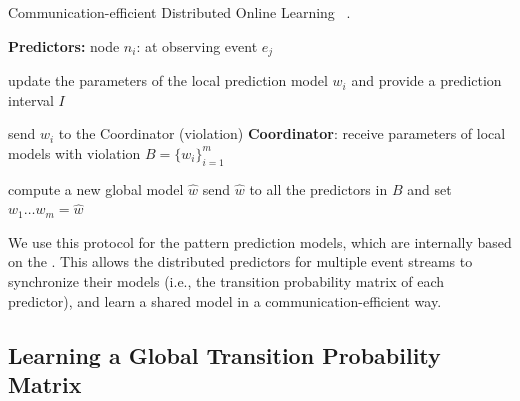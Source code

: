 \begin{algorithm}[h]
	\caption{Communication-efficient Distributed Online Learning~\cite{kamp2014communication} .} 
	\begin{algorithmic}[1] 
		
		\Statex \Indm  \textbf{Predictors:}
		\Statex \Indp node $n_i$: at observing event $e_j$
		
		\Statex \Indp update the parameters of the local prediction model $w_i$ and provide a prediction interval $I$ \;
	 

		\Statex {}  
		\Statex send  $w_i$ to the Coordinator (violation) \;
		\Statex \Indm \textbf{Coordinator}:
		\Statex \Indp receive parameters of local models with violation 
		 $B=\{w_i\}_{i=1}^m$ \;
	
	
		\Statex {}
        \Statex
		\Statex compute a new global model $\hat{w}$ \;
		\Statex send $\hat{w}$ to all the predictors in $B$ and set $w_{1}\dots w_{m}=\hat{w} $\; 
		\Statex {}
	
	\end{algorithmic}
	\label{algonline:dol}
\end{algorithm}


\par  We use this protocol for the pattern prediction models, which are internally based on the \pmcmr. This allows the distributed \pmcmr predictors for multiple event streams to synchronize their models (i.e., the transition probability matrix of each predictor), and learn a shared model in a communication-efficient way. 


\subsection*{Learning a Global Transition Probability Matrix}

